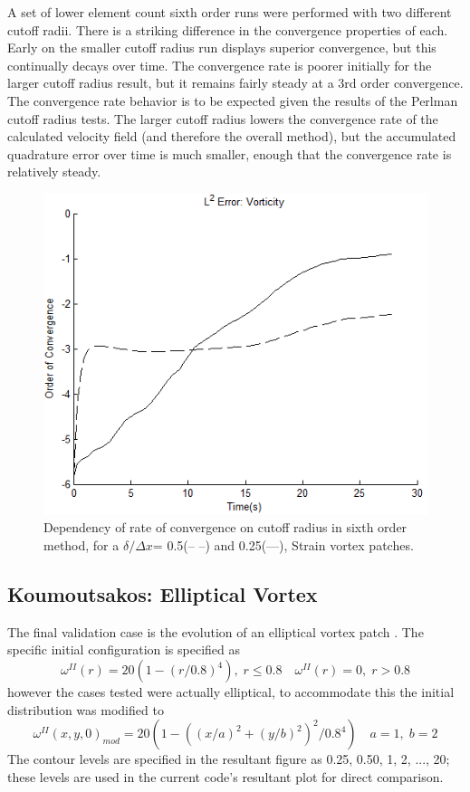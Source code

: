 \documentclass[]{aiaa-tc}%
\newcommand{\be}{\begin{equation}}
\newcommand{\ben}[1]{\begin{equation}\label{#1}}
\newcommand{\ee}{\end{equation}}
\begin{document}
A set of lower element count sixth order runs were performed with two different cutoff radii. There is a striking difference in the convergence properties of each. Early on the smaller cutoff radius run displays superior convergence, but this continually decays over time. The convergence rate is poorer initially for the larger cutoff radius result, but it remains fairly steady at a 3rd order convergence. The convergence rate behavior is to be expected given the results of the Perlman cutoff radius tests. The larger cutoff radius lowers the convergence rate of the calculated velocity field (and therefore the overall method), but the accumulated quadrature error over time is much smaller, enough that the convergence rate is relatively steady.

\begin{figure}
\centering
\includegraphics[width=.5\textwidth]{Strain6vs6R.PNG}
\caption{\label{fig:Strain6vs6}Dependency of rate of convergence on cutoff radius in sixth order method, for a $\delta/\Delta x$= 0.5(--{ }--) and 0.25(---), Strain vortex patches. }
\end{figure}

\subsection{Koumoutsakos: Elliptical Vortex}
The final validation case is the evolution of an elliptical vortex patch \cite{Koum1997}. The specific initial configuration is specified as
\be \omega^{II}(r) = 20(1-(r/0.8)^4), \; r\leq 0.8 \quad \omega^{II}(r)=0, \; r>0.8 \ee
however the cases tested were actually elliptical, to accommodate this the initial distribution was modified to
\ben{KoumEqn} \omega^{II}(x,y,0)_{mod} = 20(1-((x/a)^2+(y/b)^2)^2/0.8^4 ) \quad a=1, \; b=2 \ee
The contour levels are specified in the resultant figure as 0.25, 0.50, 1, 2, ..., 20; these levels are used in the current code's resultant plot for direct comparison.
\end{document}

